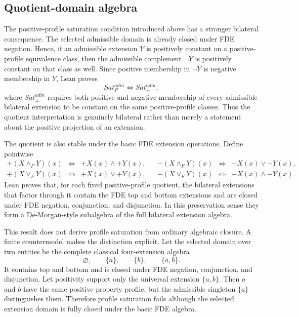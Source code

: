 \subsection{Quotient-domain algebra}
\label{sec:fitting-domain-algebra}

The positive-profile saturation condition introduced above has a stronger bilateral consequence. The selected admissible domain is already closed under FDE negation. Hence, if an admissible extension \(Y\) is positively constant on a positive-profile equivalence class, then the admissible complement \(\neg Y\) is positively constant on that class as well. Since positive membership in \(\neg Y\) is negative membership in \(Y\), Lean proves
\[
  Sat_P^{adm}\Longleftrightarrow Sat_{\pm}^{adm},
\]
where \(Sat_{\pm}^{adm}\) requires both positive and negative membership of every admissible bilateral extension to be constant on the same positive-profile classes. Thus the quotient interpretation is genuinely bilateral rather than merely a statement about the positive projection of an extension.

The quotient is also stable under the basic FDE extension operations. Define pointwise
\[
\begin{array}{rclcrcl}
 +(X\wedge_FY)(x)&\Leftrightarrow&+X(x)\land+Y(x),&&
 -(X\wedge_FY)(x)&\Leftrightarrow&-X(x)\lor-Y(x),\\
 +(X\vee_FY)(x)&\Leftrightarrow&+X(x)\lor+Y(x),&&
 -(X\vee_FY)(x)&\Leftrightarrow&-X(x)\land-Y(x).
\end{array}
\]
Lean proves that, for each fixed positive-profile quotient, the bilateral extensions that factor through it contain the FDE top and bottom extensions and are closed under FDE negation, conjunction, and disjunction. In this preservation sense they form a De-Morgan-style subalgebra of the full bilateral extension algebra.

This result does not derive profile saturation from ordinary algebraic closure. A finite countermodel makes the distinction explicit. Let the selected domain over two entities be the complete classical four-extension algebra
\[
  \varnothing,\qquad\{a\},\qquad\{b\},\qquad\{a,b\}.
\]
It contains top and bottom and is closed under FDE negation, conjunction, and disjunction. Let positivity support only the universal extension \(\{a,b\}\). Then \(a\) and \(b\) have the same positive-property profile, but the admissible singleton \(\{a\}\) distinguishes them. Therefore profile saturation fails although the selected extension domain is fully closed under the basic FDE algebra.

